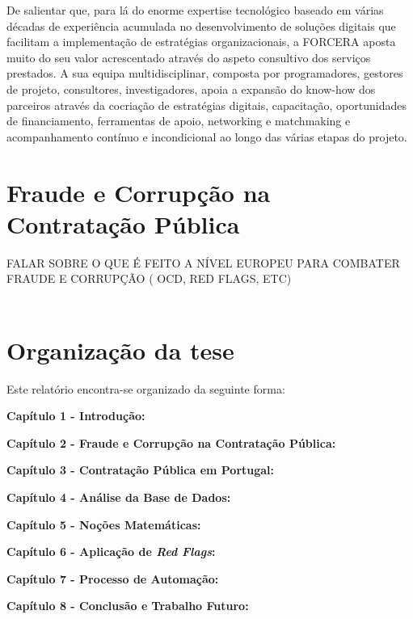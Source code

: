 De salientar que, para lá do enorme expertise tecnológico baseado em várias décadas de experiência acumulada no desenvolvimento de soluções digitais que facilitam a implementação de estratégias organizacionais, a FORCERA aposta muito do seu valor acrescentado através do aspeto consultivo dos serviços prestados. A sua equipa multidisciplinar, composta por programadores, gestores de projeto, consultores, investigadores, apoia a expansão do know-how dos parceiros através da cocriação de estratégias digitais, capacitação, oportunidades de financiamento, ferramentas de apoio, networking e matchmaking e acompanhamento contínuo e incondicional ao longo das várias etapas do projeto.



\section{Fraude e Corrupção na Contratação Pública}

FALAR SOBRE O QUE É FEITO A NÍVEL EUROPEU PARA COMBATER FRAUDE E CORRUPÇÃO ( OCD, RED FLAGS, ETC)
\\
\\



\section{Organização da tese}

Este relatório encontra-se organizado da seguinte forma: 

\textbf{Capítulo 1 - Introdução:}

\textbf{Capítulo 2 - Fraude e Corrupção na Contratação Pública:}

\textbf{Capítulo 3 - Contratação Pública em Portugal:}

\textbf{Capítulo 4 - Análise da Base de Dados:}

\textbf{Capítulo 5 - Noções Matemáticas:}

\textbf{Capítulo 6 - Aplicação de \textit{Red Flags}:}

\textbf{Capítulo 7 - Processo de Automação:}

\textbf{Capítulo 8 - Conclusão e Trabalho Futuro:}


